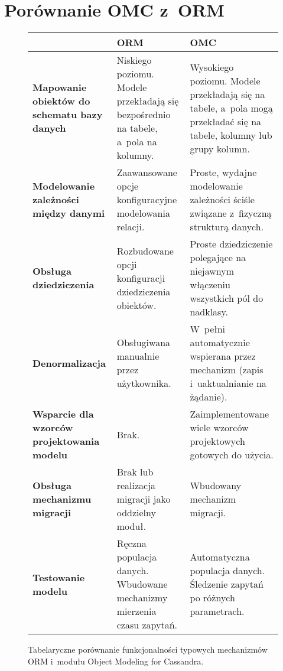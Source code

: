 \section{Porównanie OMC z~ORM}
\label{sec:omc_vs_orm_comparison}

\begin{figure}[ht!]
	\centering
	\begin{tabular}{|p{3cm}|p{4.5cm}|p{4.5cm}|}
		\hline
		& \textbf{ORM} & \textbf{OMC} \\
		\hline
		{\footnotesize \textbf{Mapowanie obiektów do schematu bazy danych}} & 
		Niskiego poziomu. Modele przekładają się bezpośrednio na tabele, a~pola na kolumny. & 
		Wysokiego poziomu. Modele przekładają się na tabele, a~pola mogą przekładać się na tabele, kolumny lub grupy kolumn. \\
		\hline
		{\footnotesize \textbf{Modelowanie zależności między danymi}} &
		Zaawansowane opcje konfiguracyjne modelowania relacji. &
		Proste, wydajne modelowanie zależności ściśle związane z~fizyczną strukturą danych. \\
		\hline
		{\footnotesize \textbf{Obsługa dziedziczenia}} & 
		Rozbudowane opcji konfiguracji dziedziczenia obiektów. & 
		Proste dziedziczenie polegające na niejawnym włączeniu wszystkich pól do nadklasy. \\
		\hline
		{\footnotesize \textbf{Denormalizacja}} &
		Obsługiwana manualnie przez użytkownika. &
		W~pełni automatycznie wspierana przez mechanizm (zapis i~uaktualnianie na żądanie). \\
		\hline
		{\footnotesize \textbf{Wsparcie dla wzorców projektowania modelu}} &
		Brak. &
		Zaimplementowane wiele wzorców projektowych gotowych do użycia. \\
		\hline 
		{\footnotesize \textbf{Obsługa mechanizmu migracji}} & 
		Brak lub realizacja migracji jako oddzielny moduł. &
		Wbudowany mechanizm migracji. \\
		\hline
		{\footnotesize \textbf{Testowanie modelu}} & 
		Ręczna populacja danych. Wbudowane mechanizmy mierzenia czasu zapytań. &
		Automatyczna populacja danych. Śledzenie zapytań po różnych parametrach. \\
		\hline
	\end{tabular}
	\caption{Tabelaryczne porównanie funkcjonalności typowych mechanizmów ORM i~modułu Object Modeling for Cassandra.}
	\label{tab:omc_vs_orm_comparison}
\end{figure}

